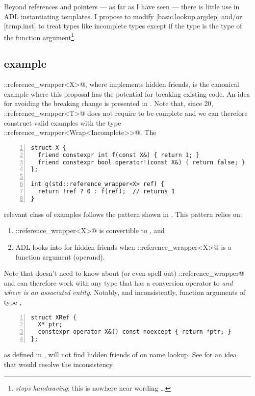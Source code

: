 Beyond references and pointers --- as far as I have seen --- there is little use in ADL 
instantiating templates. I propose to modify [basic.lookup.argdep] and/or [temp.inst] to 
treat \notyetinstantiated{} types like incomplete types except if the 
\notyetinstantiated{} type is the type of the function argument\footnote{\emph{stops 
handwaving}; this is nowhere near wording \ldots}.

\subsection{ example}\label{sec:reference_wrapper}
\codelst@std::reference_wrapper<X>@, where \codelst@X@ implements hidden friends, is the 
canonical example where this proposal has the potential for breaking existing code.
An idea for avoiding the breaking change is presented in . Note that, 
since \CC{}20, \codelst@std::reference_wrapper<T>@ does not require \codelst@T@ to be 
complete and we can therefore construct valid examples with the type 
\codelst@std::reference_wrapper<Wrap<Incomplete>>@. The
\begin{lstlisting}[numbers=left,float={hbtp},label=lst:transparent_reference_wrapper,caption={
Hidden friends are transparent for \code{std::reference_wrapper}
}]
struct X {
  friend constexpr int f(const X&) { return 1; }
  friend constexpr bool operator!(const X&) { return false; }
};

int g(std::reference_wrapper<X> ref) {
  return !ref ? 0 : f(ref);  // returns 1
}
\end{lstlisting}
relevant class of examples follows the pattern shown in 
. This pattern relies on:
\begin{enumerate}
\item \codelst@std::reference_wrapper<X>@ is convertible to \codelst@X@, and
\item ADL looks into \codelst@X@ for hidden friends when 
\codelst@std::reference_wrapper<X>@ is a function argument (operand).
\end{enumerate}
Note that \codelst@X@ doesn't need to know about (or even spell out) 
\codelst@std::reference_wrapper@ and can therefore work with any type that has a 
conversion operator to \codelst@X@ \emph{and where \codelst@X@ is an associated entity}. 
Notably, and inconsistently, function arguments of type \codelst@XRef@,
\begin{lstlisting}[numbers=left,float={hbtp},label=lst:intransparent_reference_wrapper,caption={
Hidden friends are not transparent for a non-template reference wrapper
}]
struct XRef {
  X* ptr;
  constexpr operator X&() const noexcept { return *ptr; }
};
\end{lstlisting}
as defined in , will not find hidden friends of 
\codelst@X@ on name lookup. See  for an idea that would resolve the 
inconsistency.

